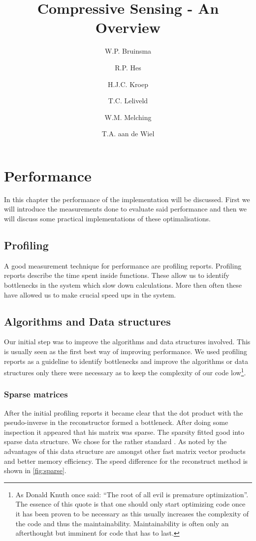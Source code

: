 \documentclass[a4paper, openany, oneside]{memoir}
\title{Compressive Sensing - An Overview}
\author{W.P. Bruinsma \and R.P. Hes \and H.J.C. Kroep \and T.C. Leliveld \and W.M. Melching \and T.A. aan de Wiel}
\begin{document}
\chapter{Performance}
\label{cha:performance}
In this chapter the performance of the implementation will be discussed. First we will introduce the measurements done to evaluate said performance and then we will discuss some practical implementations of these optimalisations.

\section{Profiling}
\label{sec:performance-profiling}
A good measurement technique for performance are profiling reports. Profiling reports describe the time spent inside functions. These allow us to identify bottlenecks in the system which slow down calculations. More then often these have allowed us to make crucial speed ups in the system.

\section{Algorithms and Data structures}
Our initial step was to improve the algorithms and data structures involved. This is usually seen as the first best way of improving performance. We used profiling reports as a guideline to identify bottlenecks and improve the algorithms or data structures only there were necessary as to keep the complexity of our code low\footnote{As Donald Knuth once said: ``The root of all evil is premature optimization''. The essence of this quote is that one should only start optimizing code once it has been proven to be necessary as this usually increases the complexity of the code and thus the maintainability. Maintainability is often only an afterthought but imminent for code that has to last.}.

\subsection{Sparse matrices}
\label{sec:sparse-matrices}
After the initial profiling reports it became clear that the dot product with the pseudo-inverse in the reconstructor formed a bottleneck. After doing some inspection it appeared that his matrix was sparse. The sparsity fitted good into  sparse data structure. We chose for the rather standard . As noted by \cite{scipy} the advantages of this data structure are amongst other fast matrix vector products and better memory efficiency. The speed difference for the reconstruct method is shown in \cref{fig:sparse}.
\end{document}
